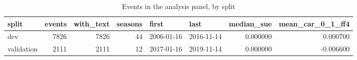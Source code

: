 \begin{table}
\caption{Events in the analysis panel, by split}
\label{tab:panel_by_split}
\begin{tabular}{lrrrllrr}
\toprule
split & events & with\_text & seasons & first & last & median\_sue & mean\_car\_0\_1\_ff4 \\
\midrule
dev & 7826 & 7826 & 44 & 2006-01-16 & 2016-11-14 & 0.000000 & 0.000700 \\
validation & 2111 & 2111 & 12 & 2017-01-16 & 2019-11-14 & 0.000000 & -0.006600 \\
\bottomrule
\end{tabular}
\end{table}
